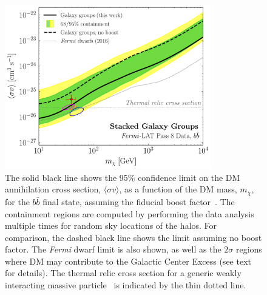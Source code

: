 \begin{figure}[t]
\centering
\includegraphics[width=0.8\textwidth]{ch-clusters/plots/bounds.pdf} \hspace{4mm}
\caption{The solid black line shows the 95\% confidence limit on the DM annihilation cross section, $\langle \sigma v \rangle$, as a function of the DM mass, $m_\chi$, for the $b \bar b$ final state, assuming the fiducial boost factor~\cite{Bartels:2015uba}. The containment regions are computed by performing the data analysis multiple times for random sky locations of the halos.  For comparison, the dashed black line shows the limit assuming no boost factor.  The {\it Fermi} dwarf limit is also shown, as well as the $2$$\sigma$ regions where DM may contribute to the Galactic Center Excess (see text for details).  The thermal relic cross section for a generic weakly interacting massive particle~\cite{Steigman:2012nb} is indicated by the thin dotted line.}
\label{fig:bounds1}
\end{figure}

